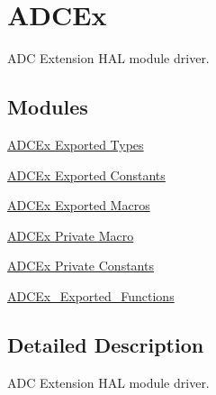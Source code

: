 \hypertarget{group___a_d_c_ex}{\section{A\-D\-C\-Ex}
\label{group___a_d_c_ex}
}


A\-D\-C Extension H\-A\-L module driver.  


\subsection*{Modules}
\begin{DoxyCompactItemize}
\item 
\hyperlink{group___a_d_c_ex___exported___types}{A\-D\-C\-Ex Exported Types}
\item 
\hyperlink{group___a_d_c_ex___exported___constants}{A\-D\-C\-Ex Exported Constants}
\item 
\hyperlink{group___a_d_c_ex___exported___macros}{A\-D\-C\-Ex Exported Macros}
\item 
\hyperlink{group___a_d_c_ex___private___macro}{A\-D\-C\-Ex Private Macro}
\item 
\hyperlink{group___a_d_c_ex___private___constants}{A\-D\-C\-Ex Private Constants}
\item 
\hyperlink{group___a_d_c_ex___exported___functions}{A\-D\-C\-Ex\-\_\-\-Exported\-\_\-\-Functions}
\end{DoxyCompactItemize}


\subsection{Detailed Description}
A\-D\-C Extension H\-A\-L module driver. 